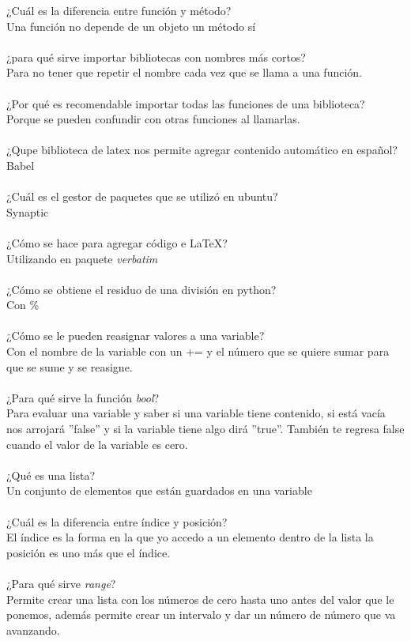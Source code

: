 \documentclass{book}
\begin{document}
	¿Cuál es la diferencia entre función y método?\\
	Una función no depende de un objeto un método sí\\
	\\
	¿para qué sirve importar bibliotecas con nombres más cortos?\\
	Para no tener que repetir el nombre cada vez que se llama a una función.\\
	\\
	¿Por qué es recomendable importar todas las funciones de una biblioteca?\\
	Porque se pueden confundir con otras funciones al llamarlas. \\
	\\
	¿Qupe biblioteca de latex nos permite agregar contenido automático en español?\\
	Babel\\
	\\
	¿Cuál es el gestor de paquetes que se utilizó en ubuntu?\\
	Synaptic\\
	\\
	¿Cómo se hace para agregar código e LaTeX?\\
	Utilizando en paquete \textit{verbatim}\\
	\\
	¿Cómo se obtiene el residuo de una división en python?\\
	Con \%\\
	\\
	¿Cómo se le pueden reasignar valores a una variable?\\
	Con el nombre de la variable con un += y el número que se quiere sumar para que se sume y se reasigne.\\
	\\
	¿Para qué sirve la función \textit{bool}? \\
	Para evaluar una variable y saber si una variable tiene contenido, si está vacía nos arrojará ”false” y si la variable tiene algo dirá ”true”. También te regresa false cuando el valor de la variable es cero.\\
	\\
	¿Qué es una lista?\\
	Un conjunto de elementos que están guardados en una variable\\
	\\
	¿Cuál es la diferencia entre índice y posición?\\
	El índice es la forma en la que yo accedo a un elemento dentro de la lista la posición es uno más que el índice.\\
	\\
	¿Para qué sirve \textit{range}?\\
	Permite crear una lista con los números de cero hasta uno antes del valor que le ponemos, además permite crear un intervalo y dar un número de número que va avanzando.\\
	
\end{document}
